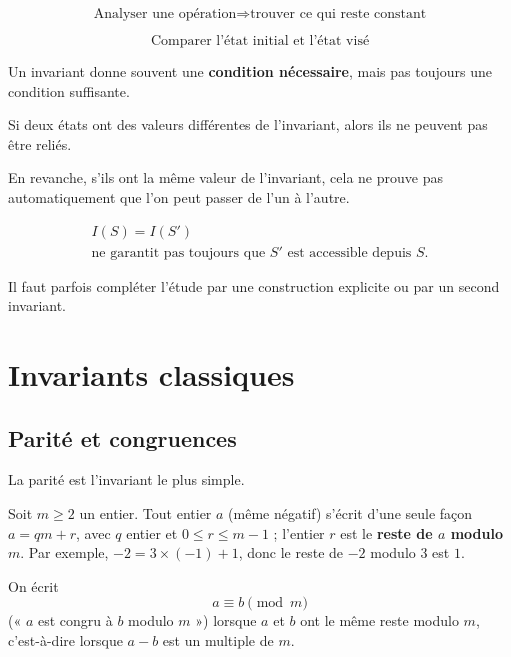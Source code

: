 \documentclass[11pt]{article}
\begin{document}
\begin{retenir}
\[
\boxed{
\text{Analyser une opération}
\Longrightarrow
\text{trouver ce qui reste constant}
}
\]

\[
\boxed{
\text{Comparer l'état initial et l'état visé}
}
\]
\end{retenir}

\begin{remarque}
Un invariant donne souvent une \textbf{condition nécessaire}, mais pas
toujours une condition suffisante.

Si deux états ont des valeurs différentes de l'invariant, alors ils ne peuvent
pas être reliés.

En revanche, s'ils ont la même valeur de l'invariant, cela ne prouve pas
automatiquement que l'on peut passer de l'un à l'autre.

\[
\boxed{\begin{gathered}
I(S)=I(S')\\
\text{ne garantit pas toujours que \(S'\) est accessible depuis \(S\).}
\end{gathered}}
\]

Il faut parfois compléter l'étude par une construction explicite ou par un
second invariant.
\end{remarque}

\section{Invariants classiques}\label{sec:invariants-classiques}

\subsection{Parité et congruences}\label{sec:parite-congruences}

La parité est l'invariant le plus simple.

\begin{definition}
Soit \(m\geq2\) un entier. Tout entier \(a\) (même négatif) s'écrit d'une
seule façon \(a=qm+r\), avec \(q\) entier et \(0\leq r\leq m-1\) ; l'entier
\(r\) est le \textbf{reste de \(a\) modulo \(m\)}. Par exemple, \(-2=3\times(-1)+1\),
donc le reste de \(-2\) modulo \(3\) est \(1\).
\end{definition}

\begin{definition}[Congruence]
On écrit
\[
a\equiv b\pmod m
\]
(« \(a\) est congru à \(b\) modulo \(m\) ») lorsque \(a\) et \(b\) ont le même
reste modulo \(m\), c'est-à-dire lorsque \(a-b\) est un multiple de \(m\).
\end{definition}
\end{document}
